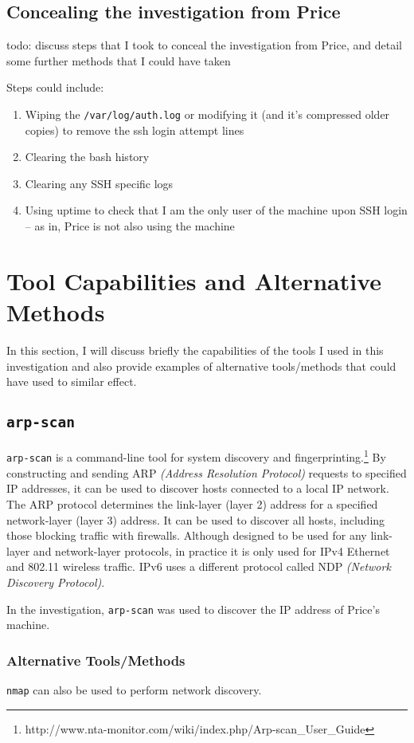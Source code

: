 \documentclass[12pt]{report}
\newcommand{\term}[1]{\colorbox{light-gray}{\texttt{#1}}}
\begin{document}
\section{Concealing the investigation from Price}
todo: discuss steps that I took to conceal the investigation from Price, and detail some further methods that I could have taken

Steps could include:
\begin{enumerate}
  \item Wiping the \texttt{/var/log/auth.log} or modifying it (and it's compressed older copies) to remove the ssh login attempt lines
  \item Clearing the bash history
  \item Clearing any SSH specific logs
  \item Using uptime to check that I am the only user of the machine upon SSH login -- as in, Price is not also using the machine
\end{enumerate}


\pagebreak
\chapter{Tool Capabilities and Alternative Methods}
In this section, I will discuss briefly the capabilities of the tools I used in this investigation and also provide examples of alternative tools/methods that could have used to similar effect.

\section{\texttt{arp-scan}}
\texttt{arp-scan} is a command-line tool for system discovery and fingerprinting.\footnote{http://www.nta-monitor.com/wiki/index.php/Arp-scan\_User\_Guide} By constructing and sending ARP \textit{(Address Resolution Protocol)} requests to specified IP addresses, it can be used to discover hosts connected to a local IP network. The ARP protocol determines the link-layer (layer 2) address for a specified network-layer (layer 3) address. It can be used to discover all hosts, including those blocking traffic with firewalls. Although designed to be used for any link-layer and network-layer protocols, in practice it is only used for IPv4 Ethernet and 802.11 wireless traffic. IPv6 uses a different protocol called NDP \textit{(Network Discovery Protocol)}.

In the investigation, \texttt{arp-scan} was used to discover the IP address of Price's machine.
\subsection*{Alternative Tools/Methods}
\texttt{nmap} can also be used to perform network discovery.
\end{document}
